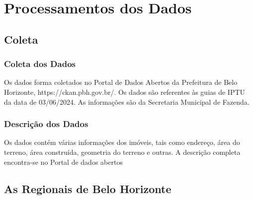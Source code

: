 \section{Processamentos dos Dados}


\subsection{Coleta}

\begin{frame}

    \frametitle{Coleta dos Dados}

    Os dados forma coletados no Portal de Dados Abertos da Prefeitura de Belo Horizonte, https://ckan.pbh.gov.br/.
    \newline
    \newline
    Os dados são referentes às guias de IPTU da data de 03/06/2024.
    \newline
    \newline
    As informações são da Secretaria Municipal de Fazenda.

\end{frame}


\begin{frame}

    \frametitle{Descrição dos Dados}
    Os dados contém várias informações dos imóveis, tais como endereço, área do terreno, área construída, geometria do terreno e outras. A descrição completa encontra-se no Portal de dados abertos
\end{frame}


\subsection{As Regionais de Belo Horizonte}

